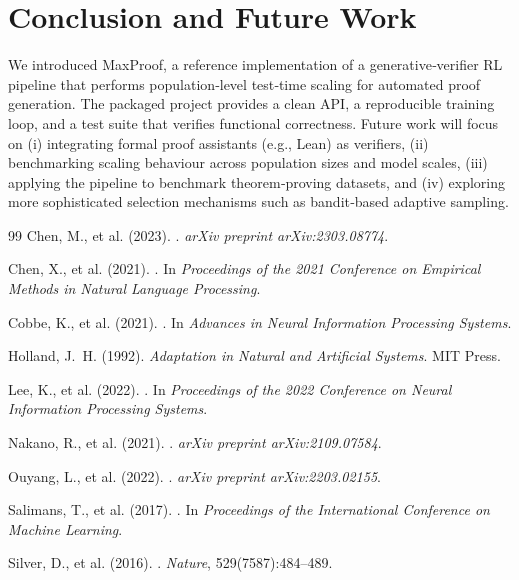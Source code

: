 \documentclass[11pt,a4paper]{article}
\begin{document}
\section{Conclusion and Future Work}
We introduced MaxProof, a reference implementation of a generative‑verifier RL pipeline that performs population‑level test‑time scaling for automated proof generation.  The packaged project provides a clean API, a reproducible training loop, and a test suite that verifies functional correctness.  Future work will focus on (i) integrating formal proof assistants (e.g., Lean) as verifiers, (ii) benchmarking scaling behaviour across population sizes and model scales, (iii) applying the pipeline to benchmark theorem‑proving datasets, and (iv) exploring more sophisticated selection mechanisms such as bandit‑based adaptive sampling.

\clearpage



\begin{thebibliography}{99}
Chen, M., et al. (2023).
.
\newblock \emph{arXiv preprint arXiv:2303.08774}.

Chen, X., et al. (2021).
.
\newblock In \emph{Proceedings of the 2021 Conference on Empirical Methods in Natural Language Processing}.

Cobbe, K., et al. (2021).
.
\newblock In \emph{Advances in Neural Information Processing Systems}.

Holland, J.~H. (1992).
\newblock \emph{Adaptation in Natural and Artificial Systems}.
\newblock MIT Press.

Lee, K., et al. (2022).
.
\newblock In \emph{Proceedings of the 2022 Conference on Neural Information Processing Systems}.

Nakano, R., et al. (2021).
.
\newblock \emph{arXiv preprint arXiv:2109.07584}.

Ouyang, L., et al. (2022).
.
\newblock \emph{arXiv preprint arXiv:2203.02155}.

Salimans, T., et al. (2017).
.
\newblock In \emph{Proceedings of the International Conference on Machine Learning}.

Silver, D., et al. (2016).
.
\newblock \emph{Nature}, 529(7587):484--489.
\end{thebibliography}
\end{document}
